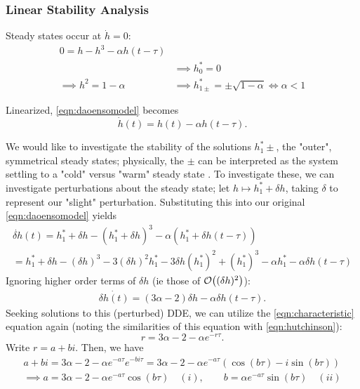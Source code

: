 \documentclass[12pt]{article}
\begin{document}
\subsubsection{Linear Stability Analysis}

Steady states occur at $\dot{h} = 0$:
\begin{align*}
    0 = h -h^3 - \alpha h(t - \tau)&\\
    &\implies h^*_0 = 0\\
    \implies h^2 = 1 - \alpha &\implies h^*_{1\pm} = \pm\sqrt{1 - \alpha} \iff \alpha < 1
\end{align*}

Linearized, \cref{eqn:daoensomodel} becomes \begin{equation}\label{eqn:linearizedsuarez}
    \dot{h}(t) = h(t) - \alpha h(t - \tau).
\end{equation}

We would like to investigate the stability of the solutions $h^*_1\pm$, the "outer", symmetrical steady states; physically, the $\pm$ can be interpreted as the system settling to a "cold" versus "warm" steady state \cite{ensomodel}. To investigate these, we can investigate perturbations about the steady state; let $h \mapsto h_1^* + \delta h$, taking $\delta$ to represent our "slight" perturbation. Substituting this into our original \cref{eqn:daoensomodel} yields
\begin{align*}
    \dot{\delta h}(t) = h_1^* + \delta h - (h_1^* + \delta h)^3 - \alpha (h_1^* + \delta h(t - \tau))\\
    = h_1^* + \delta h - (\delta h)^3 - 3 (\delta h)^2 h_1^* - 3 \delta h (h_1^*)^2 + (h_1^*)^3 - \alpha h_1^* - \alpha \delta h (t - \tau)
 \end{align*}
Ignoring higher order terms of $\delta h$ (ie those of $\order{(\delta h)^2}$):
\begin{align*}
    \dot{\delta h(t)} = (3 \alpha- 2)\delta h - \alpha \delta h(t - \tau).
\end{align*}
Seeking solutions to this (perturbed) DDE, we can utilize the \cref{eqn:characteristic} equation again (noting the similarities of this equation with \cref{eqn:hutchinson}):
\begin{equation}\label{eqn:squarezcharacter}
    r = 3 \alpha- 2 - \alpha e^{-r\tau}.
\end{equation}
Write $r = a + bi$. Then, we have \begin{align*}
    a + b i = 3 \alpha- 2 - \alpha e^{-a\tau}e^{-bi\tau} = 3 \alpha- 2 - \alpha e^{-a \tau}(\cos (b \tau) - i \sin (b \tau))\\
    \implies a = 3 \alpha- 2 - \alpha e^{-a \tau}\cos(b \tau) \quad (i), \qquad b = \alpha e^{-a \tau}\sin (b \tau) \quad (ii)
\end{align*}
\end{document}
